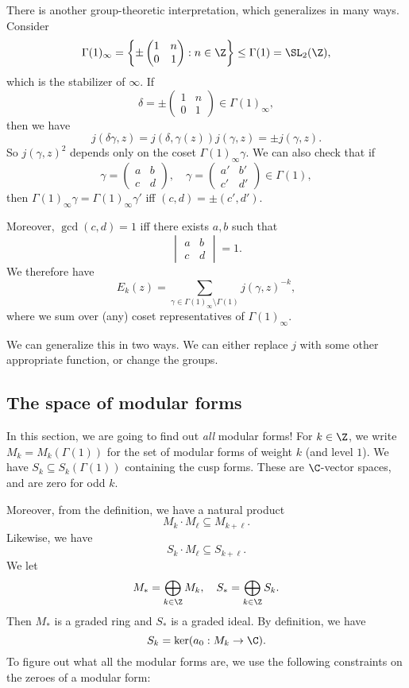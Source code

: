 \documentclass[a4paper]{article}
\begin{document}
There is another group-theoretic interpretation, which generalizes in many ways. Consider
\[
  \Gamma(1)_\infty = \left\{
    \pm
    \begin{pmatrix}
      1 & n\\
      0 & 1
    \end{pmatrix}: n \in \Z
  \right\} \leq \Gamma(1) = \SL_2(\Z),
\]
which is the stabilizer of $\infty$. If
\[
  \delta = \pm
  \begin{pmatrix}
    1 & n\\
    0 & 1
  \end{pmatrix}
  \in \Gamma(1)_\infty,
\]
then we have
\[
  j(\delta\gamma, z) = j(\delta, \gamma(z)) j(\gamma, z) = \pm j(\gamma, z).
\]
So $j(\gamma, z)^2$ depends only on the coset $\Gamma(1)_\infty \gamma$. We can also check that if
\[
  \gamma =
  \begin{pmatrix}
    a & b\\
    c & d
  \end{pmatrix},\quad
  \gamma =
  \begin{pmatrix}
    a' & b'\\
    c' & d'
  \end{pmatrix} \in \Gamma(1),
\]
then $\Gamma(1)_\infty \gamma = \Gamma(1)_\infty \gamma'$ iff $(c, d) = \pm (c', d')$.

Moreover, $\gcd(c, d) = 1 $ iff there exists $a, b$ such that
\[
  \begin{vmatrix}
    a & b\\
    c & d
  \end{vmatrix} = 1.
\]
We therefore have
\[
  E_k(z) = \sum_{\gamma \in \Gamma(1)_\infty \setminus \Gamma(1)} j(\gamma, z)^{-k},
\]
where we sum over (any) coset representatives of $\Gamma(1)_\infty$.

We can generalize this in two ways. We can either replace $j$ with some other appropriate function, or change the groups.

\subsection{The space of modular forms}
In this section, we are going to find out \emph{all} modular forms! For $k \in \Z$, we write $M_k = M_k(\Gamma(1))$ for the set of modular forms of weight $k$ (and level $1$). We have $S_k \subseteq S_k(\Gamma(1))$ containing the cusp forms. These are $\C$-vector spaces, and are zero for odd $k$.

Moreover, from the definition, we have a natural product
\[
  M_k \cdot M_\ell \subseteq M_{k + \ell}.
\]
Likewise, we have
\[
  S_k\cdot M_\ell \subseteq S_{k + \ell}.
\]
We let
\[
  M_* = \bigoplus_{k \in \Z} M_k,\quad S_* = \bigoplus_{k \in \Z} S_k.
\]
Then $M_*$ is a graded ring and $S_*$ is a graded ideal. By definition, we have
\[
  S_k = \ker (a_0: M_k \to \C).
\]
To figure out what all the modular forms are, we use the following constraints on the zeroes of a modular form:
\end{document}
